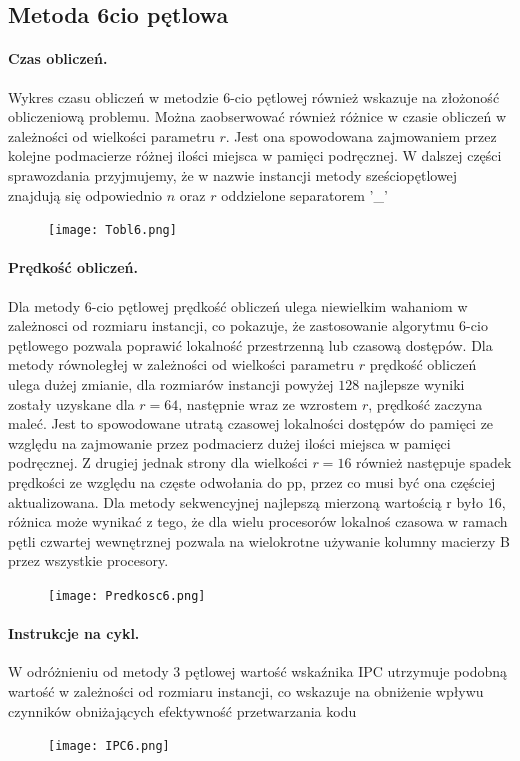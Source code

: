 \documentclass{scrartcl}
\begin{document}
\subsection{Metoda 6cio pętlowa}

\paragraph{Czas obliczeń.} Wykres czasu obliczeń w metodzie 6-cio pętlowej również wskazuje na złożoność obliczeniową problemu. Można zaobserwować również różnice w czasie obliczeń w zależności od wielkości parametru $r$. Jest ona spowodowana zajmowaniem przez kolejne podmacierze różnej ilości miejsca w pamięci podręcznej. W dalszej części sprawozdania przyjmujemy, że w nazwie instancji metody sześciopętlowej znajdują się odpowiednio $n$ oraz $r$ oddzielone separatorem '\_'
\begin{figure}[H]
\texttt{[image: Tobl6.png]}
\end{figure}

\paragraph{Prędkość obliczeń.} Dla metody 6-cio pętlowej prędkość obliczeń ulega niewielkim wahaniom w zależnosci od rozmiaru instancji, co pokazuje, że zastosowanie algorytmu 6-cio pętlowego pozwala poprawić lokalność przestrzenną lub czasową dostępów. Dla metody równoległej w zależności od wielkości parametru $r$ prędkość obliczeń ulega dużej zmianie, dla rozmiarów instancji powyżej $128$ najlepsze wyniki zostały uzyskane dla $r = 64$, następnie wraz ze wzrostem $r$, prędkość zaczyna maleć. Jest to spowodowane utratą czasowej lokalności dostępów do pamięci ze względu na zajmowanie przez podmacierz dużej ilości miejsca w pamięci podręcznej. Z drugiej jednak strony dla wielkości $r = 16$ również następuje spadek prędkości ze względu na częste odwołania do pp, przez co musi być ona częściej aktualizowana. Dla metody sekwencyjnej najlepszą mierzoną wartością r było 16, różnica może wynikać z tego, że dla wielu procesorów lokalnoś czasowa w ramach pętli czwartej wewnętrznej pozwala na wielokrotne używanie kolumny macierzy B przez wszystkie procesory.
\begin{figure}[H]
\texttt{[image: Predkosc6.png]}\\
\end{figure}

\paragraph{Instrukcje na cykl.} W odróżnieniu od metody 3 pętlowej wartość wskaźnika IPC utrzymuje podobną wartość w zależności od rozmiaru instancji, co wskazuje na obniżenie wpływu czynników obniżających efektywność przetwarzania kodu
\begin{figure}[H]
\texttt{[image: IPC6.png]}\\
\end{figure}
\end{document}
